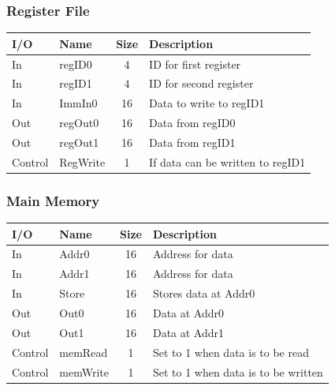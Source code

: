 \documentclass{article}
\begin{document}
		\subsubsection{Register File}
			\begin{center} \begin{tabular}{| l | l | c | l |} \hline
				I/O & Name       & Size & Description \\ \hline 
				In  & regID0     & 4    & ID for first register \\ \hline
				In  & regID1     & 4    & ID for second register \\ \hline
				In  & ImmIn0     & 16   & Data to write to regID1 \\ \hline
				Out & regOut0    & 16   & Data from regID0 \\ \hline
				Out & regOut1    & 16   & Data from regID1 \\ \hline
				Control & RegWrite & 1  & If data can be written to regID1\\ \hline
			\end{tabular} \end{center}
		\subsubsection{Main Memory}
			\begin{center} \begin{tabular}{| l | l | c | l |} \hline 
				I/O & Name  & Size & Description \\ \hline 
				In  & Addr0 & 16   & Address for data\\ \hline
				In  & Addr1 & 16   & Address for data\\ \hline
				In  & Store & 16   & Stores data at Addr0\\ \hline
				Out & Out0  & 16   & Data at Addr0 \\ \hline
				Out & Out1  & 16   & Data at Addr1 \\ \hline
				Control & memRead  & 1 & Set to 1 when data is to be read\\ \hline
				Control & memWrite & 1 & Set to 1 when data is to be written\\ \hline
			\end{tabular} \end{center}
\end{document}

